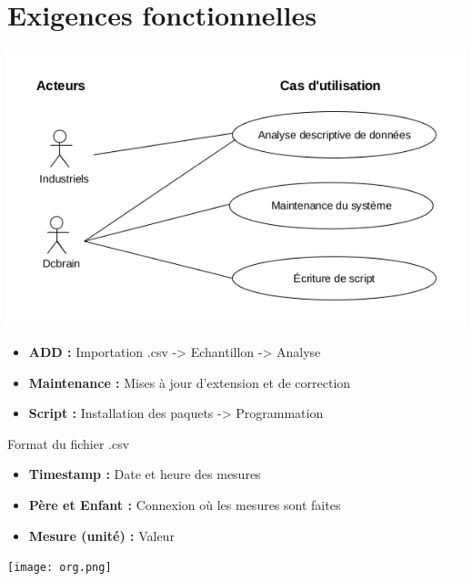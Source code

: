 	\section{Exigences fonctionnelles}
	\begin{frame}
		\begin{center}\includegraphics[scale=0.43]{../Cahier/diagCU.png}\end{center} \pause
		\begin{itemize}
			\item \textbf{ADD :} Importation .csv -> Echantillon -> Analyse
			\item \textbf{Maintenance :} Mises à jour d'extension et de correction
			\item \textbf{Script :} Installation des paquets -> Programmation
		\end{itemize} \pause
		
		Format du fichier .csv\\
		\begin{itemize}
			\item \textbf{Timestamp :} Date et heure des mesures
			\item \textbf{Père et Enfant :} Connexion où les mesures sont faites
			\item \textbf{Mesure (unité) :} Valeur
		\end{itemize}
	\end{frame}
	
	\begin{frame}
		\begin{center}\texttt{[image: org.png]}\end{center}
	\end{frame}
	
